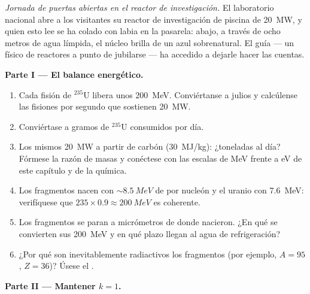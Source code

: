 \begin{problem}\label{pb:b3:nuclear-physics:1}
\emph{Jornada de puertas abiertas en el reactor de investigación.} El laboratorio nacional
abre a los visitantes su reactor de investigación de piscina de \qty{20}{MW}, y
quien esto lee se ha colado con labia en la pasarela: abajo, a través de ocho
metros de agua límpida, el núcleo brilla de un azul sobrenatural. El
guía --- un físico de reactores a punto de jubilarse --- ha accedido a dejarle
hacer las cuentas.

\medskip\noindent\textbf{Parte I --- El balance energético.}

\begin{enumerate}
  \item Cada fisión de $^{235}$U libera unos \qty{200}{MeV}.
        Conviértanse a julios y calcúlense las fisiones por segundo
        que sostienen \qty{20}{MW}.
  \item Conviértase a gramos de $^{235}$U consumidos por día.
  \item Los mismos \qty{20}{MW} a partir de carbón (\qty{30}{MJ/kg}): ¿toneladas
        al día? Fórmese la razón de masas y conéctese con las escalas
        de \unit{MeV} frente a \unit{eV} de este capítulo y de
        la química.
  \item Los fragmentos nacen con $\sim\qty{8.5}{MeV}$ de  por
        nucleón y el uranio con \qty{7.6}{MeV}: verifíquese que
        $235\times0.9 \approx \qty{200}{MeV}$ es coherente.
  \item Los fragmentos se paran a micrómetros de donde nacieron.
        ¿En qué se convierten sus \qty{200}{MeV} y en qué
        plazo llegan al agua de refrigeración?
  \item ¿Por qué son inevitablemente radiactivos los fragmentos (por ejemplo, $A = 95$,
        $Z = 36$)? Úsese el .
\end{enumerate}

\medskip\noindent\textbf{Parte II --- Mantener $k = 1$.}


\end{problem}
